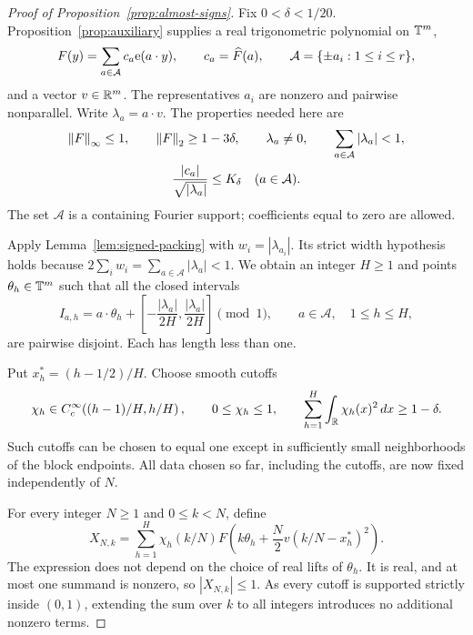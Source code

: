 \begin{proof}[Proof of Proposition~\ref{prop:almost-signs}]
Fix $0<\delta<1/20$.  Proposition~\ref{prop:auxiliary} supplies a real
trigonometric polynomial on $\mathbb T^m$,
\[
 F(y)=\sum_{a\in\mathcal A}c_a\mathrm e(a\cdot y),
 \qquad c_a=\widehat F(a),
 \qquad \mathcal A=\{\pm a_i:1\le i\le r\},
\]
and a vector $v\in\mathbb R^m$.  The representatives $a_i$ are nonzero and
pairwise nonparallel.  Write $\lambda_a=a\cdot v$.  The properties needed
here are
\begin{gather}
 \left\lVert F\right\rVert_\infty\le1,\qquad
 \left\lVert F\right\rVert_2\ge1-3\delta,\qquad
 \lambda_a\ne0,\qquad
 \sum_{a\in\mathcal A}|\lambda_a|<1,
 \label{eq:sampling-auxiliary-budgets}\\
 \frac{|c_a|}{\sqrt{|\lambda_a|}}\le K_\delta
 \quad(a\in\mathcal A).
 \label{eq:sampling-coefficient-budget}
\end{gather}
The set $\mathcal A$ is a containing Fourier support; coefficients equal
to zero are allowed.

Apply Lemma~\ref{lem:signed-packing} with $w_i=|\lambda_{a_i}|$.
Its strict width hypothesis holds because
$2\sum_i w_i=\sum_{a\in\mathcal A}|\lambda_a|<1$.
We obtain an integer $H\ge1$ and points $\theta_h\in\mathbb T^m$ such that all
the closed intervals
\begin{equation}\label{eq:sampling-packed-intervals}
 I_{a,h}=a\cdot\theta_h+
 \left[-\frac{|\lambda_a|}{2H},
             \frac{|\lambda_a|}{2H}\right]\pmod1,
 \qquad a\in\mathcal A,\quad 1\le h\le H,
\end{equation}
are pairwise disjoint.  Each has length less than one.

Put $x_h^*=(h-1/2)/H$.  Choose smooth cutoffs
\[
 \chi_h\in C_c^\infty\!\left((h-1)/H,h/H\right),\qquad
 0\le\chi_h\le1,\qquad
 \sum_{h=1}^H\int_{\mathbb R}\chi_h(x)^2\,dx\ge1-\delta.
\]
Such cutoffs can be chosen to equal one except in sufficiently small
neighborhoods of the block endpoints.  All data chosen so far, including
the cutoffs, are now fixed independently of $N$.

For every integer $N\ge1$ and $0\le k<N$, define
\begin{equation}\label{eq:sampling-coefficients}
 X_{N,k}=
 \sum_{h=1}^H\chi_h(k/N)
 F\!\left(k\theta_h+\frac N2v(k/N-x_h^*)^2\right).
\end{equation}
The expression does not depend on the choice of real lifts of
$\theta_h$.  It is real, and at most one summand is nonzero, so
$|X_{N,k}|\le1$.  As every cutoff is supported strictly inside $(0,1)$,
extending the sum over $k$ to all integers introduces no additional
nonzero terms.


\end{proof}
